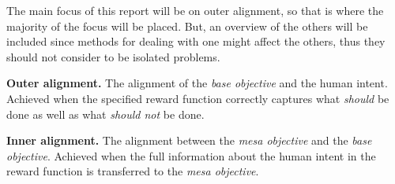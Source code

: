 \documentclass[12pt,A4]{report}
\newcommand{\autobaj}{}
\theoremstyle{definition}
\begin{document}
The main focus of this report will be on outer alignment, so that is where the majority of the focus will be placed. But, an overview of the others will be included since methods for dealing with one might affect the others, thus they should not consider to be isolated problems.


\begin{displayquote} 
\textbf{Outer alignment.} 
The alignment of the \textit{base objective} and the human intent. Achieved when the specified reward function correctly captures what \textit{should} be done as well as what \textit{should not} be done.
\end{displayquote} 

\begin{displayquote} 
  \textbf{Inner alignment.} 
The alignment between the \textit{mesa objective} and the \textit{base objective}. Achieved when the full information about the human intent in the reward function is transferred to the \textit{mesa objective}.
\end{displayquote} 





\end{document}
